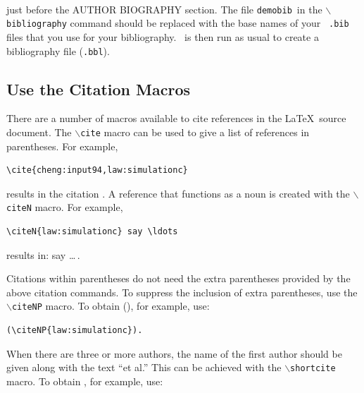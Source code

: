 \documentclass{wscpaperproc}
\theoremstyle{wsc}
\begin{document}
\begin{verbatim}


\end{verbatim}\vspace{5mm}

\noindent just before the AUTHOR BIOGRAPHY section.  The file {\tt demobib}\ in the {\tt $\backslash$bibliography} command should be replaced with the base names of your \BibTeX\ {\tt *.bib} files that you use for your bibliography.  \BibTeX\ is then run as usual to create a bibliography file ({\tt *.bbl}).

\subsection{Use the Citation Macros}
There are a number of macros available to cite references in the \LaTeX\ source document.  The {\tt $\backslash$cite} macro can be used to give a list of references in parentheses.  For example,\newline

\begin{verbatim}
\cite{cheng:input94,law:simulationc}
\end{verbatim}\vspace{5mm}

\noindent results in the citation \cite{cheng:input94,law:simulationc}. A reference that functions as a noun is created with the {\tt $\backslash$citeN}
macro.  For example,\newline


\begin{verbatim}
\citeN{law:simulationc} say \ldots
\end{verbatim}\vspace{5mm}

\noindent results in:  say \ldots\,.

Citations within parentheses do not need the extra parentheses provided by the above citation commands.  To suppress the inclusion of extra parentheses, use the {\tt $\backslash$citeNP} macro.  To obtain (), for example, use:\newline


\begin{verbatim}
(\citeNP{law:simulationc}).
\end{verbatim}\vspace{5mm}

When there are three or more authors, the name of the first author should be given along with the text ``et al.''  This can be achieved with the {\tt $\backslash$shortcite} macro. To obtain , for example, use: \newline
\end{document}
